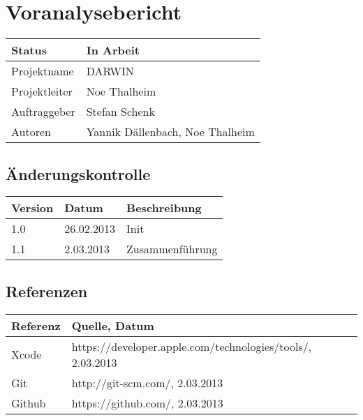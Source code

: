 \documentclass{scrartcl}
\begin{document}
	\section*{Voranalysebericht}
	
	\begin{tabularx}{\textwidth}{| X | X |}
	\hline
	Status & In Arbeit\\
	\hline
	Projektname & DARWIN\\
	\hline
	Projektleiter & Noe Thalheim\\
	\hline
	Auftraggeber & Stefan Schenk\\
	\hline
	Autoren & Yannik Dällenbach, Noe Thalheim\\
	\hline
	\end{tabularx}
	
	\subsection*{Änderungskontrolle}
	\begin{tabularx}{\textwidth}{| X | X | X |}
	\hline
	\rowcolor[gray]{0.9} Version & Datum & Beschreibung\\
	\hline
	1.0 & 26.02.2013 & Init\\
	\hline
	1.1 & 2.03.2013 & Zusammenführung\\
	\hline
	\end{tabularx}

	\subsection*{Referenzen}
	
	\begin{tabularx}{\textwidth}{| p{2.0cm} | X | }
	\hline
	\rowcolor[gray]{0.9} Referenz & Quelle, Datum\\
	\hline
	 Xcode & https://developer.apple.com/technologies/tools/, 2.03.2013\\
	 \hline
 	 Git & http://git-scm.com/, 2.03.2013\\
	 \hline
	 Github & https://github.com/, 2.03.2013\\
	 \hline
	\end{tabularx}
	
	\pagebreak
	\tableofcontents
	\pagebreak
	
	
	
	
	
	
	
	
	
	
	
\end{document}
